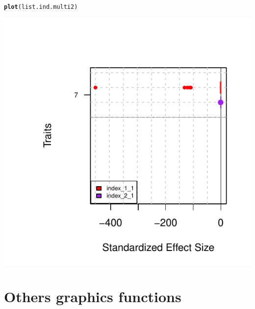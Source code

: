 \documentclass[12pt]{article}\usepackage[]{graphicx}\usepackage[]{color}
\makeatletter
\def\maxwidth{ %
  \ifdim\Gin@nat@width>\linewidth
    \linewidth
  \else
    \Gin@nat@width
  \fi
}
\newcommand{\hlstd}[1]{\textcolor[rgb]{0.345,0.345,0.345}{#1}}%
\newcommand{\hlkwd}[1]{\textcolor[rgb]{0.737,0.353,0.396}{\textbf{#1}}}%
\newenvironment{kframe}{%
 \def\at@end@of@kframe{}%
 \ifinner\ifhmode%
  \def\at@end@of@kframe{\end{minipage}}%
  \begin{minipage}{\columnwidth}%
 \fi\fi%
 \def\FrameCommand##1{\hskip\@totalleftmargin \hskip-\fboxsep
 \colorbox{shadecolor}{##1}\hskip-\fboxsep
     \hskip-\linewidth \hskip-\@totalleftmargin \hskip\columnwidth}%
 \MakeFramed {\advance\hsize-\width
   \@totalleftmargin\z@ \linewidth\hsize
   \@setminipage}}%
 {\par\unskip\endMakeFramed%
 \at@end@of@kframe}
\newenvironment{knitrout}{}{} %
\makeatother
\begin{document}
\begin{knitrout}
\color{fgcolor}\begin{kframe}
\begin{alltt}
\hlkwd{plot}\hlstd{(list.ind.multi2)}
\end{alltt}
\end{kframe}
\includegraphics[width=\maxwidth]{figure/unnamed-chunk-60} 

\end{knitrout}

\section{Others graphics functions}
\end{document}
